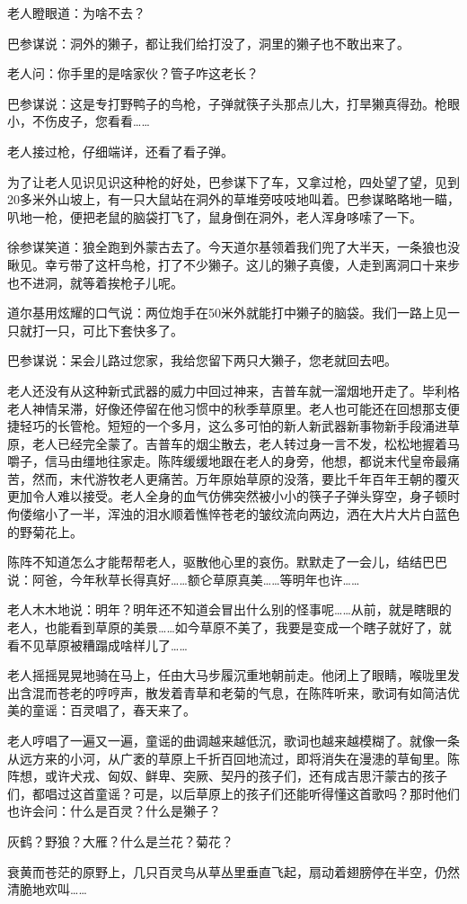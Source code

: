 \par 老人瞪眼道：为啥不去？
\par 巴参谋说：洞外的獭子，都让我们给打没了，洞里的獭子也不敢出来了。
\par 老人问：你手里的是啥家伙？管子咋这老长？
\par 巴参谋说：这是专打野鸭子的鸟枪，子弹就筷子头那点儿大，打旱獭真得劲。枪眼小，不伤皮子，您看看……
\par 老人接过枪，仔细端详，还看了看子弹。
\par 为了让老人见识见识这种枪的好处，巴参谋下了车，又拿过枪，四处望了望，见到20多米外山坡上，有一只大鼠站在洞外的草堆旁吱吱地叫着。巴参谋略略地一瞄，叭地一枪，便把老鼠的脑袋打飞了，鼠身倒在洞外，老人浑身哆嗦了一下。
\par 徐参谋笑道：狼全跑到外蒙古去了。今天道尔基领着我们兜了大半天，一条狼也没瞅见。幸亏带了这杆鸟枪，打了不少獭子。这儿的獭子真傻，人走到离洞口十来步也不进洞，就等着挨枪子儿呢。
\par 道尔基用炫耀的口气说：两位炮手在50米外就能打中獭子的脑袋。我们一路上见一只就打一只，可比下套快多了。
\par 巴参谋说：呆会儿路过您家，我给您留下两只大獭子，您老就回去吧。
\par 老人还没有从这种新式武器的威力中回过神来，吉普车就一溜烟地开走了。毕利格老人神情呆滞，好像还停留在他习惯中的秋季草原里。老人也可能还在回想那支便捷轻巧的长管枪。短短的一个多月，这么多可怕的新人新武器新事物新手段涌进草原，老人已经完全蒙了。吉普车的烟尘散去，老人转过身一言不发，松松地握着马嚼子，信马由缰地往家走。陈阵缓缓地跟在老人的身旁，他想，都说末代皇帝最痛苦，然而，末代游牧老人更痛苦。万年原始草原的没落，要比千年百年王朝的覆灭更加令人难以接受。老人全身的血气仿佛突然被小小的筷子子弹头穿空，身子顿时佝偻缩小了一半，浑浊的泪水顺着憔悴苍老的皱纹流向两边，洒在大片大片白蓝色的野菊花上。
\par 陈阵不知道怎么才能帮帮老人，驱散他心里的哀伤。默默走了一会儿，结结巴巴说：阿爸，今年秋草长得真好……额仑草原真美……等明年也许……
\par 老人木木地说：明年？明年还不知道会冒出什么别的怪事呢……从前，就是瞎眼的老人，也能看到草原的美景……如今草原不美了，我要是变成一个瞎子就好了，就看不见草原被糟蹋成啥样儿了……
\par 老人摇摇晃晃地骑在马上，任由大马步履沉重地朝前走。他闭上了眼睛，喉咙里发出含混而苍老的哼哼声，散发着青草和老菊的气息，在陈阵听来，歌词有如简洁优美的童谣：百灵唱了，春天来了。
\par 老人哼唱了一遍又一遍，童谣的曲调越来越低沉，歌词也越来越模糊了。就像一条从远方来的小河，从广袤的草原上千折百回地流过，即将消失在漫漶的草甸里。陈阵想，或许犬戎、匈奴、鲜卑、突厥、契丹的孩子们，还有成吉思汗蒙古的孩子们，都唱过这首童谣？可是，以后草原上的孩子们还能听得懂这首歌吗？那时他们也许会问：什么是百灵？什么是獭子？
\par 灰鹤？野狼？大雁？什么是兰花？菊花？
\par 衰黄而苍茫的原野上，几只百灵鸟从草丛里垂直飞起，扇动着翅膀停在半空，仍然清脆地欢叫……




